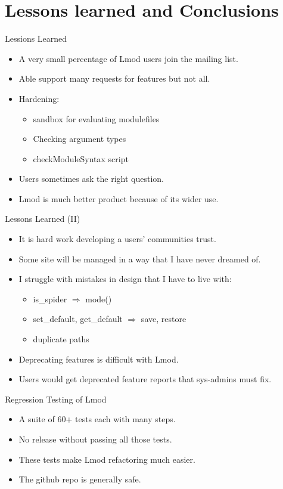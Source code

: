 \documentclass{beamer}
\begin{document}
\section{Lessons learned and Conclusions}

\begin{frame}{Lessions Learned}
  \begin{itemize}
    \item A very small percentage of Lmod users join the mailing list.
    \item Able support many requests for features but not all.
    \item Hardening:
      \begin{itemize}
        \item sandbox for evaluating modulefiles
        \item Checking argument types
        \item checkModuleSyntax script
      \end{itemize}
    \item Users sometimes ask the right question.
    \item Lmod is much better product because of its wider use.
  \end{itemize}
\end{frame}

\begin{frame}{Lessons Learned (II)}
  \begin{itemize}
    \item It is hard work developing a users' communities trust.
    \item Some site will be managed in a way that I have never dreamed of.
    \item I struggle with mistakes in design that I have to live with:
      \begin{itemize}
        \item is\_spider $\Rightarrow$ mode()
        \item set\_default, get\_default $\Rightarrow$ save, restore
        \item duplicate paths
      \end{itemize}
    \item Deprecating features is difficult with Lmod.
    \item Users would get deprecated feature reports that sys-admins
      must fix.
  \end{itemize}
\end{frame}


\begin{frame}{Regression Testing of Lmod}
  \begin{itemize}
    \item A suite of 60+ tests each with many steps.
    \item No release without passing all those tests.
    \item These tests make Lmod refactoring much easier.
    \item The github repo is generally safe.
  \end{itemize}
\end{frame}
\end{document}
